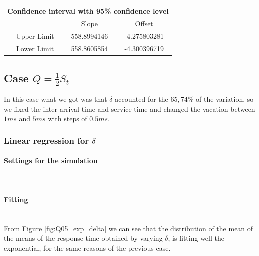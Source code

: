 \documentclass{article}
\begin{document}
                    \begin{table}[htbp]
                        \centering 
                        \begin{tabular}{|c|c|c|}
                            
                            \hline
                            \multicolumn{3}{|c|}{\bf Confidence interval with 95\% confidence level} \\
                            
                            \hline
                            \ & Slope & Offset\\
                            \hline
                            \ Upper Limit & 558.8994146 & -4.275803281 \\ 
                            \hline
                            \ Lower Limit & 558.8605854 & -4.300396719 \\ 
                            \hline
                        \end{tabular}
                        \label{table:CI_01_fitting}
                    \end{table}
    \newpage               
        \subsection{Case $Q = \frac{1}{2}S_t$}
            In this case what we got was that $\delta$ accounted for the $65,74\%$ of the variation, so we fixed the inter-arrival time and service time and changed the vacation between $1ms$ and $5ms$ with steps of $0.5ms$. 
            \subsubsection{Linear regression for $\delta$}
                \paragraph{Settings for the simulation} \hfill \\
                    
                \paragraph{Fitting} \hfill \\

                    From Figure \ref{fig:Q05_exp_delta} we can see that the distribution of the mean of the means of the response time obtained by varying $\delta$, is fitting well the exponential, for the same reasons of the previous case.\\
                    
\end{document}
